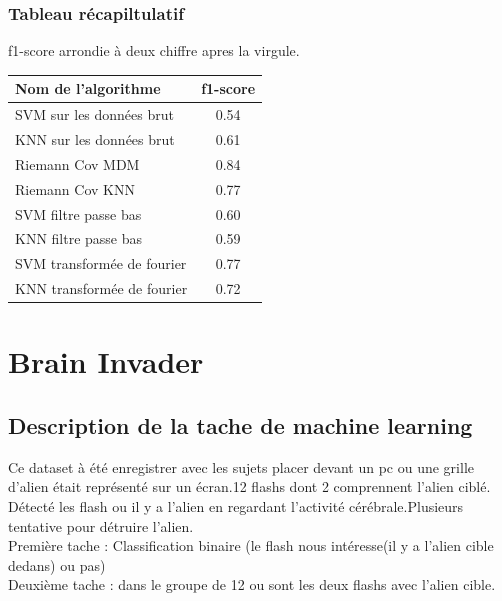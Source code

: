 \documentclass{article}[12pt]
\begin{document}
\subsubsection{Tableau récapiltulatif}
f1-score arrondie à deux chiffre apres la virgule.\\
\begin{center}
\begin{tabular}{|l|c|}
  \hline
  Nom de l'algorithme & f1-score\\
  \hline
  SVM sur les données brut & 0.54 \\
  KNN sur les données brut & 0.61\\
  Riemann Cov MDM  & 0.84 \\
  Riemann Cov KNN & 0.77\\
  SVM filtre passe bas & 0.60 \\
  KNN filtre passe bas & 0.59 \\
  SVM transformée de fourier & 0.77 \\
  KNN transformée de fourier & 0.72 \\
  \hline
\end{tabular}
\end{center}
\section{Brain Invader}
\subsection{Description de la tache de machine learning}
Ce dataset à été enregistrer avec les sujets placer devant un pc ou une grille d'alien était représenté sur un écran.12 flashs dont 2 comprennent l'alien ciblé. Détecté les flash ou il y a l'alien en regardant l'activité cérébrale.Plusieurs tentative pour détruire l'alien.\\
Première tache : Classification binaire (le flash nous intéresse(il y a l'alien cible dedans) ou pas)\\
Deuxième tache : dans le groupe de 12 ou sont les deux flashs avec l'alien cible.\\
\end{document}
